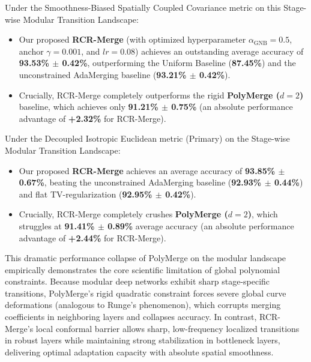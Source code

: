 Under the Smoothness-Biased Spatially Coupled Covariance metric on this Stage-wise Modular Transition Landscape:
\begin{itemize}
    \item Our proposed \textbf{RCR-Merge} (with optimized hyperparameter $\alpha_{\text{GNB}} = 0.5$, anchor $\gamma = 0.001$, and $lr = 0.08$) achieves an outstanding average accuracy of \textbf{93.53\% $\pm$ 0.42\%}, outperforming the Uniform Baseline (\textbf{87.45\%}) and the unconstrained AdaMerging baseline (\textbf{93.21\% $\pm$ 0.42\%}).
    \item Crucially, RCR-Merge completely outperforms the rigid \textbf{PolyMerge ($d=2$)} baseline, which achieves only \textbf{91.21\% $\pm$ 0.75\%} (an absolute performance advantage of \textbf{+2.32\%} for RCR-Merge).
\end{itemize}
Under the Decoupled Isotropic Euclidean metric (Primary) on the Stage-wise Modular Transition Landscape:
\begin{itemize}
    \item Our proposed \textbf{RCR-Merge} achieves an average accuracy of \textbf{93.85\% $\pm$ 0.67\%}, beating the unconstrained AdaMerging baseline (\textbf{92.93\% $\pm$ 0.44\%}) and flat TV-regularization (\textbf{92.95\% $\pm$ 0.42\%}).
    \item Crucially, RCR-Merge completely crushes \textbf{PolyMerge ($d=2$)}, which struggles at \textbf{91.41\% $\pm$ 0.89\%} average accuracy (an absolute performance advantage of \textbf{+2.44\%} for RCR-Merge).
\end{itemize}
This dramatic performance collapse of PolyMerge on the modular landscape empirically demonstrates the core scientific limitation of global polynomial constraints. Because modular deep networks exhibit sharp stage-specific transitions, PolyMerge's rigid quadratic constraint forces severe global curve deformations (analogous to Runge's phenomenon), which corrupts merging coefficients in neighboring layers and collapses accuracy. In contrast, RCR-Merge's local conformal barrier allows sharp, low-frequency localized transitions in robust layers while maintaining strong stabilization in bottleneck layers, delivering optimal adaptation capacity with absolute spatial smoothness.

